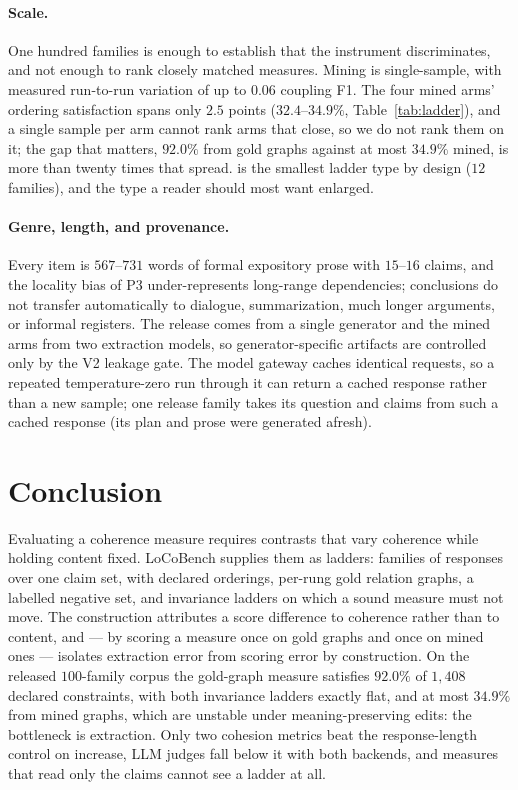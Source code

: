\paragraph{Scale.} One hundred families is enough to establish that
the instrument discriminates, and not enough to rank closely matched measures. Mining is single-sample, with
measured run-to-run variation of up to $0.06$ coupling F1. The four mined arms' ordering satisfaction spans
only $2.5$ points ($32.4$--$34.9\%$, Table~\ref{tab:ladder}), and a single sample per arm cannot rank arms that
close, so we do not rank them on it; the gap that matters, $92.0\%$ from gold graphs against at most $34.9\%$
mined, is more than twenty times that spread.
 is the smallest ladder type by design ($12$ families), and the type a reader should most
want enlarged.

\paragraph{Genre, length, and provenance.} Every item is $567$--$731$ words of formal expository prose with
$15$--$16$ claims, and the locality bias of P3 under-represents long-range dependencies; conclusions do not
transfer automatically to dialogue, summarization, much longer arguments, or informal registers. The release
comes from a single generator and the mined arms from two extraction models, so generator-specific artifacts
are controlled only by the V2 leakage gate. The model gateway caches identical requests, so a repeated
temperature-zero run through it can return a cached response rather than a new sample; one release family takes
its question and claims from such a cached response (its plan and prose were generated afresh).

\section{Conclusion}

Evaluating a coherence measure requires contrasts that vary coherence while holding content fixed. LoCoBench supplies
them as ladders: families of responses over one claim set, with declared orderings, per-rung gold relation graphs, a
labelled negative set, and invariance ladders on which a sound measure must not move. The construction attributes a
score difference to coherence rather than to content, and --- by scoring a measure once on gold graphs and once on
mined ones --- isolates extraction error from scoring error by construction. On the released $100$-family corpus the
gold-graph measure satisfies $92.0\%$ of $1{,}408$ declared constraints, with both invariance ladders exactly flat,
and at most $34.9\%$ from mined graphs, which are unstable under meaning-preserving edits: the bottleneck is
extraction. Only two
cohesion metrics beat the response-length control on increase, LLM judges fall below it with both backends, and
measures that read only the claims cannot see a ladder at all.

